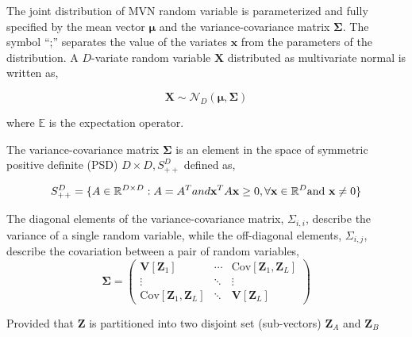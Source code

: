 The joint distribution of MVN random variable is parameterized and fully specified by the mean vector $\boldsymbol{\mu}$ and the variance-covariance matrix $\boldsymbol{\Sigma}$. The symbol ``;'' separates the value of the variates $\boldsymbol{x}$ from the parameters of the distribution. 
A $D$-variate random variable $\boldsymbol{X}$ distributed as multivariate normal is written as,

\begin{equation}
	\boldsymbol{X} \sim \mathcal{N}_D\left(\boldsymbol{\mu}, \boldsymbol{\Sigma}\right)
\end{equation}

where $\mathbb{E}$ is the expectation operator.

The variance-covariance matrix $\boldsymbol{\Sigma}$ is an element in the space of symmetric positive definite (PSD) $D \times D, S_{++}^D$ defined as,

\begin{equation}
	S_{++}^D = \{A \in \mathbb{R}^{D\times D}: A = A^T and \mathbf{x}^T A \mathbf{x} \geq 0, \forall \mathbf{x} \in \mathbb{R}^D \textnormal{and } \mathbf{x} \neq 0 \}
	\label{eq:def_covariance_matrix}
\end{equation}






The diagonal elements of the variance-covariance matrix, $\Sigma_{i,i}$, describe the variance of a single random variable,
while the off-diagonal elements, $\Sigma_{i,j}$, describe the covariation between a pair of random variables,
\begin{equation}
	\boldsymbol{\Sigma} =
	\begin{pmatrix}
			\mathbf{V}[\mathbf{Z}_1] & \cdots                & \text{Cov}[\mathbf{Z}_1, \mathbf{Z}_L] \\
			\vdots                   & \ddots                & \vdots \\
			\text{Cov}[\mathbf{Z}_1, \mathbf{Z}_L] & \ddots & \mathbf{V}[\mathbf{Z}_L]
	\end{pmatrix}
\label{eq:covariance_matrix}
\end{equation}

Provided that $\mathbf{Z}$ is partitioned into two disjoint set (sub-vectors) $\mathbf{Z}_A$ and $\mathbf{Z}_B$

